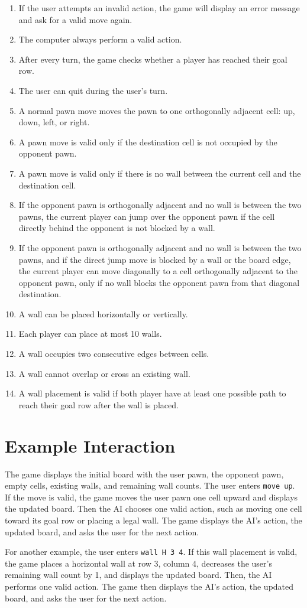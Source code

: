 \documentclass{article}
\begin{document}
\begin{enumerate}
	\item If the user attempts an invalid action, the game will display an error message and ask for a valid move again.
	\item The computer always perform a valid action.
	\item After every turn, the game checks whether a player has reached their goal row.
	\item The user can quit during the user's turn.
	\item A normal pawn move moves the pawn to one orthogonally adjacent cell: up, down, left, or right.
	\item A pawn move is valid only if the destination cell is not occupied by the opponent pawn.
	\item A pawn move is valid only if there is no wall between the current cell and the destination cell.
	\item If the opponent pawn is orthogonally adjacent and no wall is between the two pawns, the current player can jump over the opponent pawn if the cell directly behind the opponent is not blocked by a wall.
	\item If the opponent pawn is orthogonally adjacent and no wall is between the two pawns, and if the direct jump move is blocked by a wall or the board edge, the current player can move diagonally to a cell orthogonally adjacent to the opponent pawn, only if no wall blocks the opponent pawn from that diagonal destination.
	\item A wall can be placed horizontally or vertically.
	\item Each player can place at most 10 walls.
	\item A wall occupies two consecutive edges between cells.
	\item A wall cannot overlap or cross an existing wall.
	\item A wall placement is valid if both player have at least one possible path to reach their goal row after the wall is placed.
\end{enumerate}

\section{Example Interaction}

The game displays the initial board with the user pawn, the opponent pawn, empty cells, existing walls, and remaining wall counts. The user enters \texttt{move up}. If the move is valid, the game moves the user pawn one cell upward and displays the updated board. Then the AI chooses one valid action, such as moving one cell toward its goal row or placing a legal wall. The game displays the AI's action, the updated board, and asks the user for the next action.

For another example, the user enters \texttt{wall H 3 4}. If this wall placement is valid, the game places a horizontal wall at row 3, column 4, decreases the user's remaining wall count by 1, and displays the updated board. Then, the AI performs one valid action. The game then displays the AI's action, the updated board, and asks the user for the next action.
\end{document}
